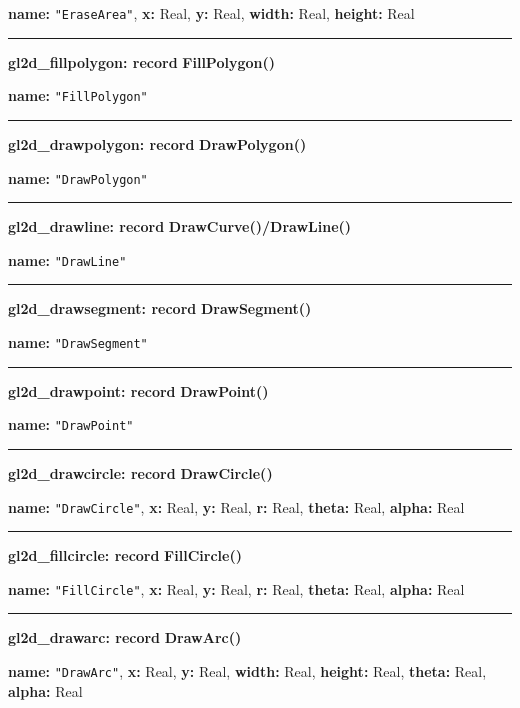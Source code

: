 \documentclass[letterpaper,12pt]{article}
\begin{document}
{\bf name:} \texttt{"EraseArea"},\newline\indent
{\bf x:} Real,
{\bf y:} Real,
{\bf width:} Real,
{\bf height:} Real

\bigskip\hrule\vspace{0.1cm}
\noindent
{\bf gl2d\_fillpolygon: record} \hfill {\bf FillPolygon()} 

{\bf name:} \texttt{"FillPolygon"}

\bigskip\hrule\vspace{0.1cm}
\noindent
{\bf gl2d\_drawpolygon: record} \hfill {\bf DrawPolygon()} 

{\bf name:} \texttt{"DrawPolygon"}

\bigskip\hrule\vspace{0.1cm}
\noindent
{\bf gl2d\_drawline: record} \hfill {\bf DrawCurve()/DrawLine()} 

{\bf name:} \texttt{"DrawLine"}

\bigskip\hrule\vspace{0.1cm}
\noindent
{\bf gl2d\_drawsegment: record} \hfill {\bf DrawSegment()} 

{\bf name:} \texttt{"DrawSegment"}

\bigskip\hrule\vspace{0.1cm}
\noindent
{\bf gl2d\_drawpoint: record} \hfill {\bf DrawPoint()} 

{\bf name:} \texttt{"DrawPoint"}

\bigskip\hrule\vspace{0.1cm}
\noindent
{\bf gl2d\_drawcircle: record} \hfill {\bf DrawCircle()} 

{\bf name:} \texttt{"DrawCircle"},\newline\indent
{\bf x:} Real,
{\bf y:} Real,
{\bf r:} Real,
{\bf theta:} Real,
{\bf alpha:} Real

\bigskip\hrule\vspace{0.1cm}
\noindent
{\bf gl2d\_fillcircle: record} \hfill {\bf FillCircle()} 

{\bf name:} \texttt{"FillCircle"},\newline\indent
{\bf x:} Real,
{\bf y:} Real,
{\bf r:} Real,
{\bf theta:} Real,
{\bf alpha:} Real

\bigskip\hrule\vspace{0.1cm}
\noindent
{\bf gl2d\_drawarc: record} \hfill {\bf DrawArc()} 

{\bf name:} \texttt{"DrawArc"},\newline\indent
{\bf x:} Real,
{\bf y:} Real,
{\bf width:} Real,
{\bf height:} Real,
{\bf theta:} Real,
{\bf alpha:} Real
\end{document}
